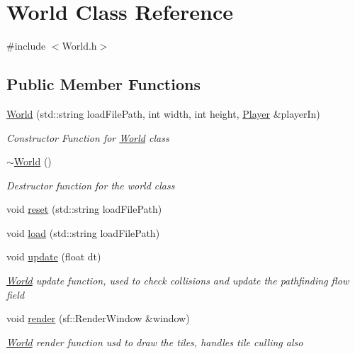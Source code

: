 \hypertarget{class_world}{}\section{World Class Reference}
\label{class_world}


{\ttfamily \#include $<$World.\+h$>$}

\subsection*{Public Member Functions}
\begin{DoxyCompactItemize}
\item 
\mbox{\hyperlink{class_world_a17361a1afdbe590b713a9704244a6d57}{World}} (std\+::string load\+File\+Path, int width, int height, \mbox{\hyperlink{class_player}{Player}} \&player\+In)
\begin{DoxyCompactList}\small\item\em Constructor Function for \mbox{\hyperlink{class_world}{World}} class \end{DoxyCompactList}\item 
\mbox{\hyperlink{class_world_a8c73fba541a5817fff65147ba47cd827}{$\sim$\+World}} ()
\begin{DoxyCompactList}\small\item\em Destructor function for the world class \end{DoxyCompactList}\item 
void \mbox{\hyperlink{class_world_aef1be6281463d26f71eec97cb233060d}{reset}} (std\+::string load\+File\+Path)
\item 
void \mbox{\hyperlink{class_world_a1c49801c5b871dae1a2713cd146c703a}{load}} (std\+::string load\+File\+Path)
\item 
void \mbox{\hyperlink{class_world_a26a44f3778d66147edf6636472c166ba}{update}} (float dt)
\begin{DoxyCompactList}\small\item\em \mbox{\hyperlink{class_world}{World}} update function, used to check collisions and update the pathfinding flow field \end{DoxyCompactList}\item 
void \mbox{\hyperlink{class_world_a6be69ff54f7f29713c0954cabe34aecc}{render}} (sf\+::\+Render\+Window \&window)
\begin{DoxyCompactList}\small\item\em \mbox{\hyperlink{class_world}{World}} render function usd to draw the tiles, handles tile culling also \end{DoxyCompactList}\item 

\end{DoxyCompactItemize}

